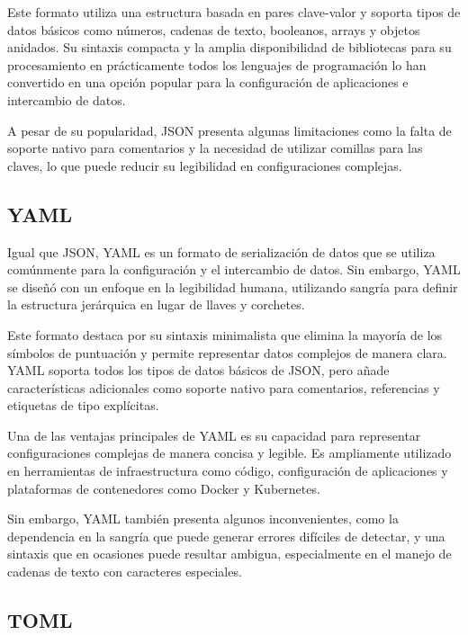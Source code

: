 Este formato utiliza una estructura basada en pares clave-valor y soporta tipos de datos básicos como números, cadenas de texto, booleanos, arrays y objetos anidados. Su sintaxis compacta y la amplia disponibilidad de bibliotecas para su procesamiento en prácticamente todos los lenguajes de programación lo han convertido en una opción popular para la configuración de aplicaciones e intercambio de datos.

A pesar de su popularidad, \ac{JSON} presenta algunas limitaciones como la falta de soporte nativo para comentarios y la necesidad de utilizar comillas para las claves, lo que puede reducir su legibilidad en configuraciones complejas.


\subsection{\acs{YAML}}

Igual que \ac{JSON}, \ac{YAML} es un formato de serialización de datos que se utiliza comúnmente para la configuración y el intercambio de datos. Sin embargo, \ac{YAML} se diseñó con un enfoque en la legibilidad humana, utilizando sangría para definir la estructura jerárquica en lugar de llaves y corchetes.

Este formato destaca por su sintaxis minimalista que elimina la mayoría de los símbolos de puntuación y permite representar datos complejos de manera clara. \ac{YAML} soporta todos los tipos de datos básicos de \ac{JSON}, pero añade características adicionales como soporte nativo para comentarios, referencias y etiquetas de tipo explícitas.

Una de las ventajas principales de \ac{YAML} es su capacidad para representar configuraciones complejas de manera concisa y legible. Es ampliamente utilizado en herramientas de infraestructura como código, configuración de aplicaciones y plataformas de contenedores como Docker y Kubernetes.

Sin embargo, \ac{YAML} también presenta algunos inconvenientes, como la dependencia en la sangría que puede generar errores difíciles de detectar, y una sintaxis que en ocasiones puede resultar ambigua, especialmente en el manejo de cadenas de texto con caracteres especiales.


\subsection{\acs{TOML}}

